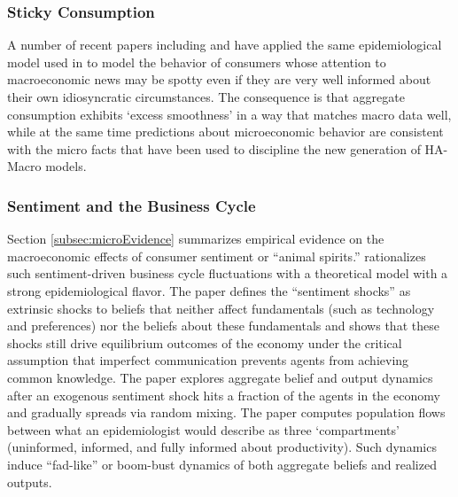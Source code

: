 \subsubsection{Sticky Consumption}

A number of recent papers including \cite{carroll2020sticky} and \cite{auclert2020micro} have applied the same epidemiological model used in \cite{carroll2003macroeconomic} to model the behavior of consumers whose attention to macroeconomic news may be spotty even if they are very well informed about their own idiosyncratic circumstances.  The consequence is that aggregate consumption exhibits `excess smoothness' in a way that matches macro data well, while at the same time predictions about microeconomic behavior are consistent with the micro facts that have been used to discipline the new generation of HA-Macro models.


\subsubsection{Sentiment and the Business Cycle}

Section \ref{subsec:microEvidence} summarizes empirical evidence on the macroeconomic effects of consumer sentiment or ``animal spirits.'' \cite{angeletos2013sentiments} rationalizes such sentiment-driven business cycle fluctuations with a theoretical model with a strong epidemiological flavor. The paper defines the ``sentiment shocks'' as extrinsic shocks to beliefs that neither affect fundamentals (such as technology and preferences) nor the beliefs about these fundamentals and shows that these shocks still drive equilibrium outcomes of the economy under the critical assumption that imperfect communication prevents agents from achieving common knowledge.  The paper explores aggregate belief and output dynamics after an exogenous sentiment shock hits a fraction of the agents in the economy and gradually spreads via random mixing.  The paper computes  population flows between what an epidemiologist would describe as three `compartments' (uninformed, informed, and fully informed about productivity). Such dynamics induce ``fad-like'' or boom-bust dynamics of both aggregate beliefs and realized outputs.


